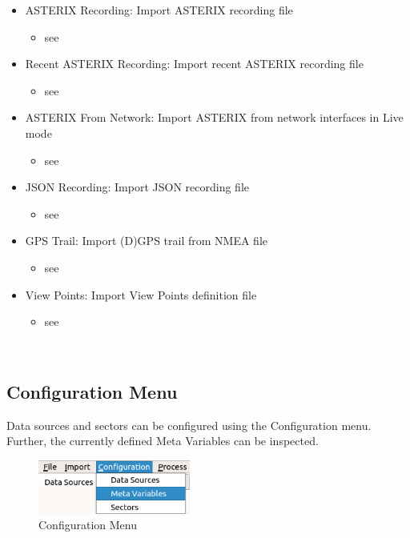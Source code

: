 \begin{itemize}
 \item ASTERIX Recording: Import ASTERIX recording file
 \begin{itemize}
 \item see 
 \end{itemize}
 \item Recent ASTERIX Recording: Import recent ASTERIX recording file
  \begin{itemize}
 \item see 
 \end{itemize}
 \item ASTERIX From Network: Import ASTERIX from network interfaces in Live mode
  \begin{itemize}
 \item see 
 \end{itemize}
 \item JSON Recording: Import JSON recording file
  \begin{itemize}
 \item see 
 \end{itemize}
 \item GPS Trail: Import (D)GPS trail from NMEA file
  \begin{itemize}
 \item see 
 \end{itemize}
 \item View Points: Import View Points definition file
  \begin{itemize}
 \item see 
 \end{itemize}
\end{itemize}
\  \\

\subsection{Configuration Menu}
\label{sec:ui_overview_config_menu}

Data sources and sectors can be configured using the Configuration menu. Further, the currently defined Meta Variables can be inspected.

\begin{figure}[H]
  \center
    \includegraphics[width=5cm,frame]{figures/ui_configuration_menu.png}
  \caption{Configuration Menu}
\end{figure}

